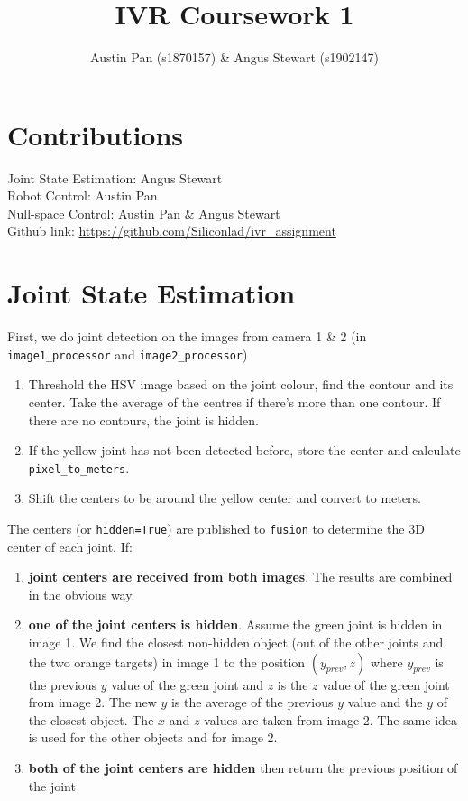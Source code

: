 \documentclass[11pt]{article}
\begin{document}
\title{IVR Coursework 1}
\author{Austin Pan (s1870157) \& Angus Stewart (s1902147)}
\date{\vspace{-5ex}}
\maketitle

\section{Contributions}
Joint State Estimation: Angus Stewart \\
Robot Control: Austin Pan \\
Null-space Control: Austin Pan \& Angus Stewart \\
Github link: \url{https://github.com/Siliconlad/ivr\_assignment}

\section{Joint State Estimation} \label{jse:alg}

First, we do joint detection on the images from camera 1 \& 2 (in \texttt{image1\_processor} and \texttt{image2\_processor})
\begin{enumerate}
    \item Threshold the HSV image based on the joint colour, find the contour and its center. Take the average of the centres if there's more than one contour. If there are no contours, the joint is hidden.
    \item If the yellow joint has not been detected before, store the center and calculate \texttt{pixel\_to\_meters}.
    \item Shift the centers to be around the yellow center and convert to meters.
\end{enumerate}

\noindent The centers (or \texttt{hidden=True}) are published to \texttt{fusion} to determine the 3D center of each joint. If:
\begin{enumerate}
    \item \textbf{joint centers are received from both images}. The results are combined in the obvious way.
    \item \textbf{one of the joint centers is hidden}. Assume the green joint is hidden in image 1. We find the closest non-hidden object (out of the other joints and the two orange targets) in image 1 to the position $(y_{prev}, z)$ where $y_{prev}$ is the previous $y$ value of the green joint and $z$ is the $z$ value of the green joint from image 2. The new $y$ is the average of the previous $y$ value and the $y$ of the closest object. The $x$ and $z$ values are taken from image 2. The same idea is used for the other objects and for image 2.
    \item \textbf{both of the joint centers are hidden} then return the previous position of the joint
\end{enumerate}
\end{document}
